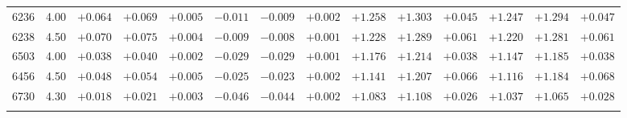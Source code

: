 \documentclass[]{aa}
\begin{document}
\begin{appendix}
\begin{table*}
\begin{center}
\begin{tabular}{llllllllllllll}
6236  &4.00 & $+0.064$ & $+0.069$ & $+0.005$ & $-0.011$ & $-0.009$ & $+0.002$ & $+1.258$ & $+1.303$ & $+0.045$ & $+1.247$ & $+1.294$ & $+0.047$ \\
6238  &4.50 & $+0.070$ & $+0.075$ & $+0.004$ & $-0.009$ & $-0.008$ & $+0.001$ & $+1.228$ & $+1.289$ & $+0.061$ & $+1.220$ & $+1.281$ & $+0.061$ \\
6503  &4.00 & $+0.038$ & $+0.040$ & $+0.002$ & $-0.029$ & $-0.029$ & $+0.001$ & $+1.176$ & $+1.214$ & $+0.038$ & $+1.147$ & $+1.185$ & $+0.038$ \\
6456  &4.50 & $+0.048$ & $+0.054$ & $+0.005$ & $-0.025$ & $-0.023$ & $+0.002$ & $+1.141$ & $+1.207$ & $+0.066$ & $+1.116$ & $+1.184$ & $+0.068$ \\
6730  &4.30 & $+0.018$ & $+0.021$ & $+0.003$ & $-0.046$ & $-0.044$ & $+0.002$ & $+1.083$ & $+1.108$ & $+0.026$ & $+1.037$ & $+1.065$ & $+0.028$ \\
\hline\noalign{\smallskip}
\hline\noalign{\smallskip}
\end{tabular}
\end{center}
\end{table*}


\end{appendix}
\end{document}
